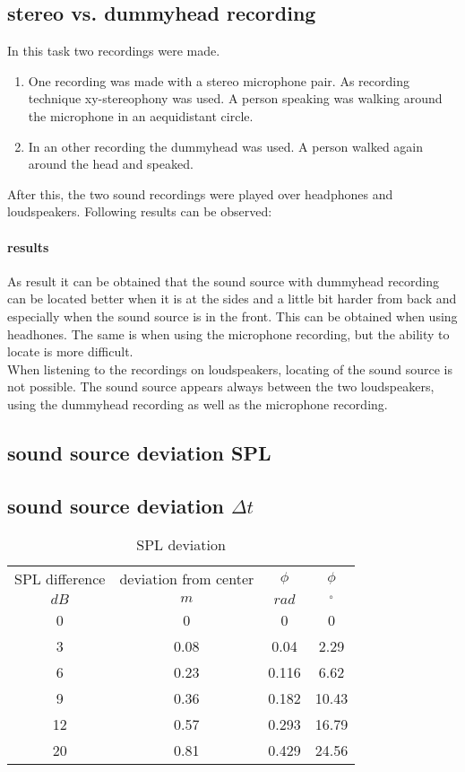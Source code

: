 \documentclass{article}
\begin{document}
\subsection{stereo vs. dummyhead recording}
In this task two recordings were made. 
\begin{enumerate}
\item One recording was made with a stereo microphone pair. As recording technique xy-stereophony was used. A person speaking was walking around the microphone in an aequidistant circle.
\item In an other recording the dummyhead was used. A person walked again around the head and speaked.
\end{enumerate}
After this, the two sound recordings were played over headphones and loudspeakers. Following results can be observed:
\paragraph{results\\}
As result it can be obtained that the sound source with dummyhead recording can be located better when it is at the sides and a little bit harder from back and especially when the sound source is in the front. This can be obtained when using headhones. The same is when using the microphone recording, but the ability to locate is more difficult.\\
When listening to the recordings on loudspeakers, locating of the sound source is not possible. The sound source appears always between the two loudspeakers, using the dummyhead recording as well as the microphone recording.
\subsection{sound source deviation SPL}

\subsection{sound source deviation $\Delta t$}



\begin{table}
\begin{center}
\begin{tabular}{|c||c||c|c|}
\hline
SPL difference & deviation from center & $\phi$ & $\phi$ \\
$dB$	&	$m$	&	$rad$	&	$^\circ$		\\
\hline
\hline
0 & 0 & 0 & 0\\
\hline
3 & 0.08 & 0.04 & 2.29 \\
\hline
6 & 0.23 & 0.116 & 6.62\\
\hline
9 & 0.36 & 0.182 & 10.43\\
\hline
12 & 0.57 & 0.293 & 16.79\\
\hline
20 & 0.81 & 0.429 & 24.56\\
\hline
\end{tabular}
\caption{SPL deviation}
\label{tab:SPL}
\end{center}
\end{table}
\end{document}
